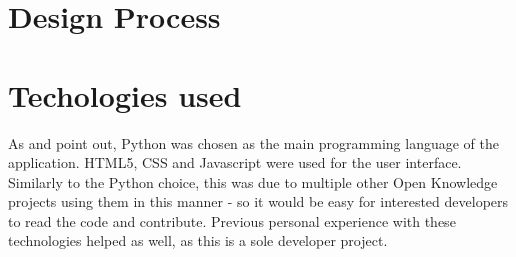 
\section{Design Process}


\section{Techologies used}
\label{devprocess-tech-used}


As  and  point out, Python was chosen as the main programming language of the application. HTML5, CSS and Javascript were used for the user interface. Similarly to the Python choice, this was due to multiple other Open Knowledge projects using them in this manner - so it would be easy for interested developers to read the code and contribute. Previous personal experience with these technologies helped as well, as this is a sole developer project.


